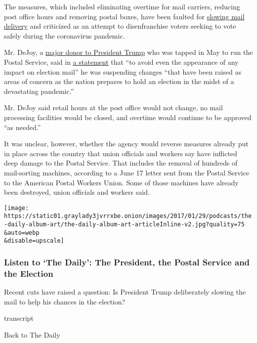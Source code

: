 The measures, which included eliminating overtime for mail carriers,
reducing post office hours and removing postal boxes, have been faulted
for
\href{https://www.nytimes3xbfgragh.onion/2020/08/21/us/postal-service-mail-rural.html}{slowing
mail delivery} and criticized as an attempt to disenfranchise voters
seeking to vote safely during the coronavirus pandemic.

Mr. DeJoy, a
\href{https://www.nytimes3xbfgragh.onion/2020/05/07/us/politics/postmaster-general-louis-dejoy.html}{major
donor to President Trump} who was tapped in May to run the Postal
Service, said in
\href{https://about.usps.com/newsroom/national-releases/2020/0818-postmaster-general-louis-dejoy-statement.htm}{a
statement} that ``to avoid even the appearance of any impact on election
mail'' he was suspending changes ``that have been raised as areas of
concern as the nation prepares to hold an election in the midst of a
devastating pandemic.''

Mr. DeJoy said retail hours at the post office would not change, no mail
processing facilities would be closed, and overtime would continue to be
approved ``as needed.''

It was unclear, however, whether the agency would reverse measures
already put in place across the country that union officials and workers
say have inflicted deep damage to the Postal Service. That includes the
removal of hundreds of mail-sorting machines, according to a June 17
letter sent from the Postal Service to the American Postal Workers
Union. Some of those machines have already been destroyed, union
officials and workers said.

\texttt{[image: https://static01.graylady3jvrrxbe.onion/images/2017/01/29/podcasts/the-daily-album-art/the-daily-album-art-articleInline-v2.jpg?quality=75\\\&auto=webp\\\&disable=upscale]}

\hypertarget{listen-to-the-daily-the-president-the-postal-service-and-the-election}{%
\subsubsection{Listen to `The Daily': The President, the Postal Service
and the
Election}\label{listen-to-the-daily-the-president-the-postal-service-and-the-election}}

Recent cuts have raised a question: Is President Trump deliberately
slowing the mail to help his chances in the election?

transcript

Back to The Daily


